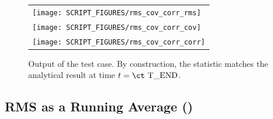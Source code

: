 \documentclass[11pt]{book}
\begin{document}
\begin{figure}[p]
\centering
\begin{tabular}{l}
\texttt{[image: SCRIPT\_FIGURES/rms\_cov\_corr\_rms]}\\
\texttt{[image: SCRIPT\_FIGURES/rms\_cov\_corr\_cov]} \\
\texttt{[image: SCRIPT\_FIGURES/rms\_cov\_corr\_corr]}
\end{tabular}
\caption[Sample case ]{Output of the  test case.  By construction, the statistic matches the analytical result at time $t = \mbox{\ct T\_END}$.}
\label{rms_cov_corr_plots}
\end{figure}

\FloatBarrier

\subsection{RMS as a Running Average (\texorpdfstring{}{rms\_example})}
\label{rms_example}
\end{document}
